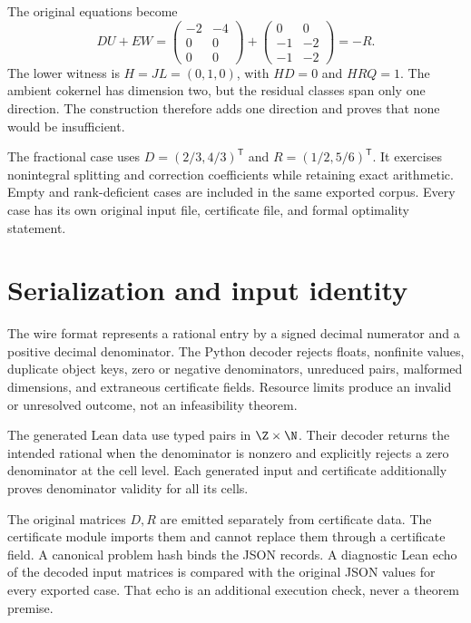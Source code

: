 The original equations become
\[
 DU+EW=
 \begin{pmatrix}-2&-4\\0&0\\0&0\end{pmatrix}+
 \begin{pmatrix}0&0\\-1&-2\\-1&-2\end{pmatrix}=-R.
\]
The lower witness is $H=JL=(0,1,0)$, with $HD=0$ and $HRQ=1$. The ambient cokernel has dimension two, but the residual classes span only one direction. The construction therefore adds one direction and proves that none would be insufficient.

The fractional case uses $D=(2/3,4/3)^{\mathsf T}$ and $R=(1/2,5/6)^{\mathsf T}$. It exercises nonintegral splitting and correction coefficients while retaining exact arithmetic. Empty and rank-deficient cases are included in the same exported corpus. Every case has its own original input file, certificate file, and formal optimality statement.

\section{Serialization and input identity}
The wire format represents a rational entry by a signed decimal numerator and a positive decimal denominator. The Python decoder rejects floats, nonfinite values, duplicate object keys, zero or negative denominators, unreduced pairs, malformed dimensions, and extraneous certificate fields. Resource limits produce an invalid or unresolved outcome, not an infeasibility theorem.

The generated Lean data use typed pairs in $\Z\times\N$. Their decoder returns the intended rational when the denominator is nonzero and explicitly rejects a zero denominator at the cell level. Each generated input and certificate additionally proves denominator validity for all its cells.

The original matrices $D,R$ are emitted separately from certificate data. The certificate module imports them and cannot replace them through a certificate field. A canonical problem hash binds the JSON records. A diagnostic Lean echo of the decoded input matrices is compared with the original JSON values for every exported case. That echo is an additional execution check, never a theorem premise.


